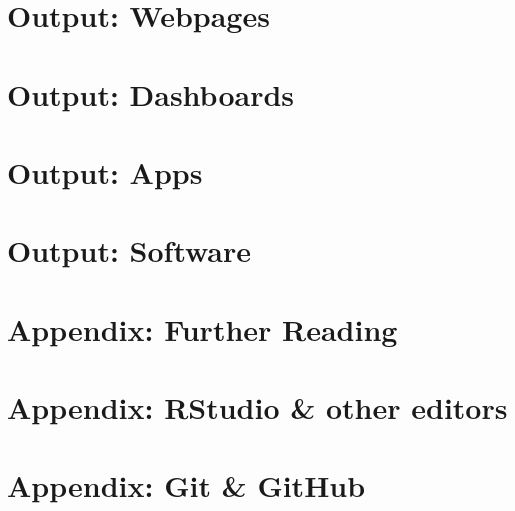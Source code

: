 \documentclass[
]{article}
\theoremstyle{definition}
\theoremstyle{definition}
\theoremstyle{definition}
\theoremstyle{definition}
\theoremstyle{remark}
\begin{document}
\hypertarget{output-webpages}{%
\section{Output: Webpages}\label{output-webpages}}

\hypertarget{output-dashboards}{%
\section{Output: Dashboards}\label{output-dashboards}}

\hypertarget{output-apps}{%
\section{Output: Apps}\label{output-apps}}

\hypertarget{output-software}{%
\section{Output: Software}\label{output-software}}

\hypertarget{appendix-further-reading}{%
\section{Appendix: Further Reading}\label{appendix-further-reading}}

\hypertarget{appendix-rstudio-other-editors}{%
\section{Appendix: RStudio \& other editors}\label{appendix-rstudio-other-editors}}

\hypertarget{appendix-git-github}{%
\section{Appendix: Git \& GitHub}\label{appendix-git-github}}
\end{document}
